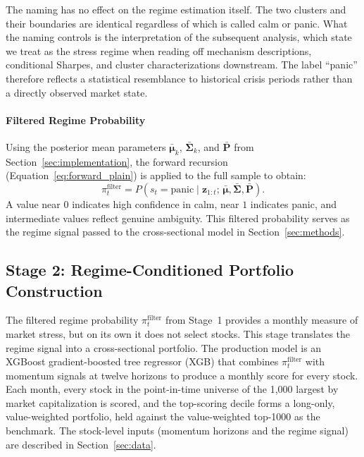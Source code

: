 The naming has no effect on the regime estimation itself. The two clusters and their boundaries are identical regardless of which is called calm or panic. What the naming controls is the interpretation of the subsequent analysis, which state we treat as the stress regime when reading off mechanism descriptions, conditional Sharpes, and cluster characterizations downstream. The label ``panic'' therefore reflects a statistical resemblance to historical crisis periods rather than a directly observed market state.

\paragraph{Filtered Regime Probability}\label{sec:trading_signal}

Using the posterior mean parameters $\bar{\boldsymbol{\mu}}_k$, $\bar{\boldsymbol{\Sigma}}_k$, and $\bar{\mathbf{P}}$ from Section~\ref{sec:implementation}, the forward recursion (Equation~\ref{eq:forward_plain}) is applied to the full sample to obtain:
\begin{equation}
\pi_t^{\text{filter}}
=
P(s_t=\text{panic} \mid \mathbf{z}_{1:t};\,\bar{\boldsymbol{\mu}},\bar{\boldsymbol{\Sigma}},\bar{\mathbf{P}}).
\end{equation}
A value near $0$ indicates high confidence in calm, near $1$ indicates panic, and intermediate values reflect genuine ambiguity. This filtered probability serves as the regime signal passed to the cross-sectional model in Section~\ref{sec:methods}.

\subsection{Stage 2: Regime-Conditioned Portfolio Construction}\label{sec:stage2}

The filtered regime probability $\pi_t^{\text{filter}}$ from Stage~1 provides a monthly measure of market stress, but on its own it does not select stocks. This stage translates the regime signal into a cross-sectional portfolio. The production model is an XGBoost gradient-boosted tree regressor (XGB) that combines $\pi_t^{\text{filter}}$ with momentum signals at twelve horizons to produce a monthly score for every stock. Each month, every stock in the point-in-time universe of the 1{,}000 largest by market capitalization is scored, and the top-scoring decile forms a long-only, value-weighted portfolio, held against the value-weighted top-1000 as the benchmark. The stock-level inputs (momentum horizons and the regime signal) are described in Section~\ref{sec:data}.

